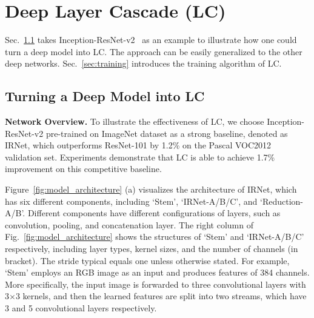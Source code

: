 \documentclass[10pt,twocolumn,letterpaper]{article}
\begin{document}
\section{Deep Layer Cascade (LC)}
\label{sec:methodology}







Sec.~\ref{sec:turning_into_LC} takes Inception-ResNet-v2~\cite{szegedy2016inception} as an example to illustrate how one could turn a deep model into LC.
The approach can be easily generalized to the other deep networks.
Sec.~\ref{sec:training} introduces the training algorithm of LC.

\subsection{Turning a Deep Model into LC}
\label{sec:turning_into_LC}


\noindent
\textbf{Network Overview.} 
To illustrate the effectiveness of LC, we choose Inception-ResNet-v2 pre-trained on ImageNet dataset as a strong baseline, denoted as IRNet, which outperforms ResNet-101 by 1.2\% on the Pascal VOC2012 validation set.
Experiments demonstrate that LC is able to achieve 1.7\% improvement on this competitive baseline.


Figure~\ref{fig:model_architecture} (a) visualizes the architecture of IRNet, which has six different components, including `Stem', `IRNet-A/B/C', and `Reduction-A/B'.
Different components have different configurations of layers, such as convolution, pooling, and concatenation layer.
The right column of Fig.~\ref{fig:model_architecture} shows the structures of `Stem' and `IRNet-A/B/C' respectively, including layer types, kernel sizes, and the number of channels (in bracket).
The stride typical equals one unless otherwise stated.
For example, `Stem' employs an RGB image as an input and produces features of 384 channels.
More specifically, the input image is forwarded to three convolutional layers with 3$\times$3 kernels, and then the learned features are split into two streams, which have 3 and 5 convolutional layers respectively.
\end{document}
